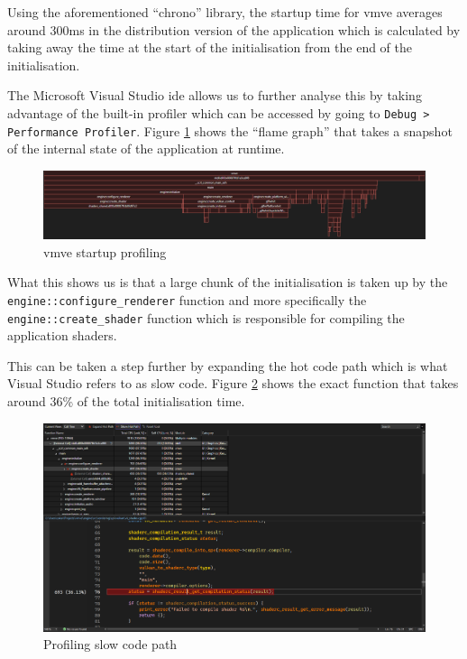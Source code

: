 \documentclass[11pt]{article}
\begin{document}
Using the aforementioned ``chrono'' library, the startup time for \gls*{vmve}
averages around 300ms in the distribution version of the application which is
calculated by taking away the time at the start of the initialisation from the
end of the initialisation.

The Microsoft Visual Studio \gls*{ide} allows us to further analyse this by
taking advantage of the built-in profiler which can be accessed by going to
\lstinline{Debug > Performance Profiler}. Figure
\ref{fig:vmve_startup_profiling} shows the ``flame graph'' that takes a snapshot
of the internal state of the application at runtime.

\begin{figure}[H]
  \centering
  \includegraphics[width=\textwidth]{images/startup_profiling_graph.png}
  \caption{\gls*{vmve} startup profiling}
  \label{fig:vmve_startup_profiling}
\end{figure}

What this shows us is that a large chunk of the initialisation is taken up by
the \lstinline{engine::configure_renderer} function and more specifically the
\lstinline{engine::create_shader} function which is responsible for compiling
the application shaders.

This can be taken a step further by expanding the hot code path which is what
Visual Studio refers to as slow code. Figure \ref{fig:vmve_slow_code_path} shows
the exact function that takes around 36\% of the total initialisation time.
\begin{figure}[H]
  \centering
  \includegraphics[width=\textwidth]{images/startup_profiling_slow_shader_compile.png}
  \caption{Profiling slow code path}
  \label{fig:vmve_slow_code_path}
\end{figure}
\end{document}
